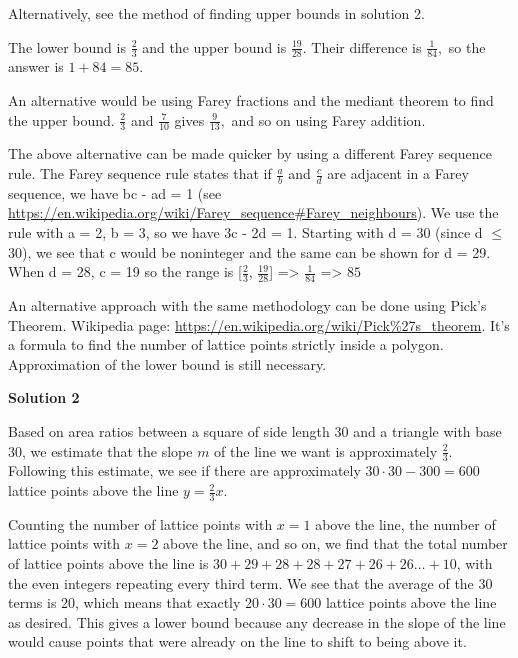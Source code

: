 \begin{enumerate}
 Alternatively, see the method of finding upper bounds in solution 2.

 The lower bound is $\frac{2}{3}$ and the upper bound is $\frac{19}{28}.$ Their difference is $\frac{1}{84},$ so the answer is $1 + 84 = \boxed{85}.$

 An alternative would be using Farey fractions and the mediant theorem to find the upper bound. $\frac{2}{3}$ and $\frac{7}{10}$ gives $\frac{9}{13},$ and so on using Farey addition. 

 The above alternative can be made quicker by using a different Farey sequence rule. The Farey sequence rule states that if $\frac{a}{b}$ and $\frac{c}{d}$ are adjacent in a Farey sequence, we have bc - ad = 1 (see \href{https://en.wikipedia.org/wiki/Farey\_sequence\#Farey\_neighbours}{https://en.wikipedia.org/wiki/Farey\_sequence\#Farey\_neighbours}). We use the rule with a = 2, b = 3, so we have 3c - 2d = 1. Starting with d = 30 (since d $\leq$ 30), we see that c would be noninteger and the same can be shown for d = 29. When d = 28, c = 19 so the range is [$\frac{2}{3}$, $\frac{19}{28}$] => $\frac{1}{84}$ => $\boxed{85}$

 
An alternative approach with the same methodology can be done using Pick's Theorem. Wikipedia page: \href{https://en.wikipedia.org/wiki/Pick\%27s\_theorem}{https://en.wikipedia.org/wiki/Pick\%27s\_theorem}. It's a formula to find the number of lattice points strictly inside a polygon. Approximation of the lower bound is still necessary.

 



\textbf{Solution 2}

Based on area ratios between a square of side length $30$ and a triangle with base $30$, we estimate that the slope $m$ of the line we want is approximately $\frac{2}{3}$. Following this estimate, we see if there are approximately $30 \cdot 30 - 300 = 600$ lattice points above the line $y=\frac{2}{3}x$.

 Counting the number of lattice points with $x=1$ above the line, the number of lattice points with $x=2$ above the line, and so on, we find that the total number of lattice points above the line is $30+29+28+28+27+26+26 \ldots+ 10$, with the even integers repeating every third term. We see that the average of the $30$ terms is $20$, which means that exactly $20 \cdot 30 = 600$ lattice points above the line as desired. This gives a lower bound because any decrease in the slope of the line would cause points that were already on the line to shift to being above it.


\end{enumerate}
